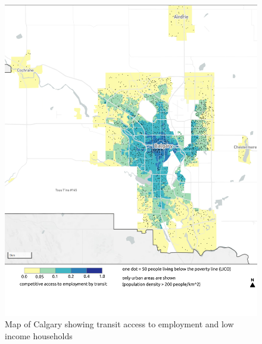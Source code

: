\documentclass[11 pt, letterpaper]{article}
\begin{document}
{\begin{figure}[H]
	\caption{Map of Calgary showing transit access to employment and low income households} 
	\label{a_van}
	\centerline{\includegraphics[width=6.5in]{figures/appendix_maps/a_cgy.png}}
	\vspace{2mm}
\end{figure}

}
\end{document}

